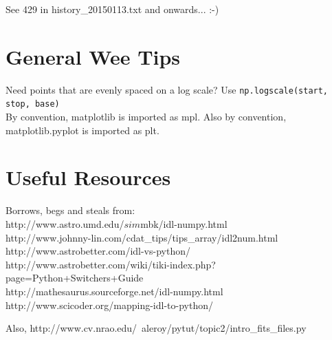 \documentclass[11pt,a4paper]{article}
\begin{document}
See 429 in history\_20150113.txt and onwards... :-) 



\section*{General Wee Tips}
Need points that are evenly spaced on a log scale? Use {\tt np.logscale(start, stop, base)} \\
By convention, matplotlib is imported as mpl. Also by convention, matplotlib.pyplot is imported as plt.\\




\section*{Useful Resources}
Borrows, begs and steals from: \\
http://www.astro.umd.edu/$sim$mbk/idl-numpy.html\\
http://www.johnny-lin.com/cdat\_tips/tips\_array/idl2num.html\\
http://www.astrobetter.com/idl-vs-python/ \\
http://www.astrobetter.com/wiki/tiki-index.php?page=Python+Switchers+Guide \\
http://mathesaurus.sourceforge.net/idl-numpy.html
http://www.scicoder.org/mapping-idl-to-python/

\noindent
Also, 
http://www.cv.nrao.edu/~aleroy/pytut/topic2/intro\_fits\_files.py

\noindent
\end{document}
